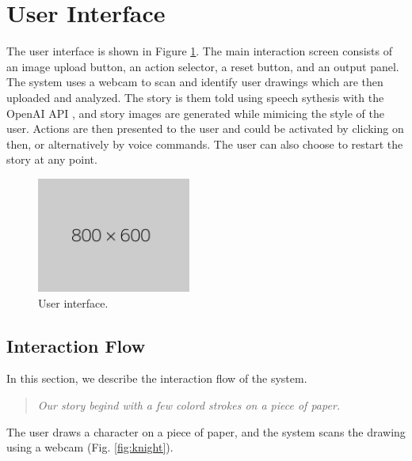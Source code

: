 \documentclass[submit,techrep,english]{ipsj}
\begin{document}
\section{User Interface}
\label{sec:user-interface}
The user interface is shown in Figure \ref{fig:user-interface}. The main interaction screen consists of an image upload button, an action selector, a reset button, and an output panel. The system uses a webcam to scan and identify user drawings which are then uploaded and analyzed. The story is them told using speech sythesis with the OpenAI API \cite{21:openai-api}, and story images are generated while mimicing the style of the user. Actions are then presented to the user and could be activated by clicking on then, or alternatively by voice commands. The user can also choose to restart the story at any point.

\begin{figure}[t]
    \centering
    \includegraphics[width=0.45\textwidth]{figures/800x600px.png}
    \caption{User interface.}
    \label{fig:user-interface}
\end{figure}

\subsection{Interaction Flow}
\label{subsec:interaction-flow}
In this section, we describe the interaction flow of the system.

\vspace{10pt} %

\begin{quote}
    \textit{Our story begind with a few colord strokes on a piece of paper.}
\end{quote}

\vspace{10pt} %

The user draws a character on a piece of paper, and the system scans the drawing using a webcam (Fig. \ref{fig:knight}).
\end{document}
